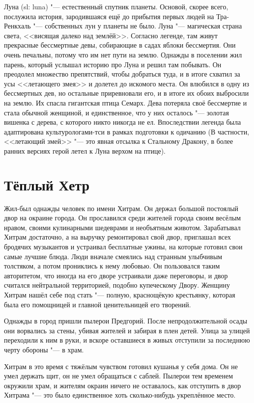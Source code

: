 \documentclass[a4paper,10pt,fleqn]{book}
\begin{document}
Луна (sl: luna) "--- естественный спутник планеты.
Основой, скорее всего, послужила история, зародившаяся ещё до прибытия первых людей на Тра-Ренкхаль "--- собственных лун у планеты не было.
Луна "--- магическая страна света, <<висящая далеко над землёй>>.
Согласно легенде, там живут прекрасные бессмертные девы, собирающие в садах яблоки бессмертия.
Они очень печальны, потому что им нет пути на землю.
Однажды в поселении жил парень, который услышал историю про Луна и решил там побывать.
Он преодолел множество препятствий, чтобы добраться туда, и в итоге схватил за усы <<летающего змея>> и долетел до искомого места.
Он влюбился в одну из бессмертных дев, но остальные приревновали его, и в итоге их обоих выбросили на землю.
Их спасла гигантская птица Семарх.
Дева потеряла своё бессмертие и стала обычной женщиной, и единственное, что у них осталось "--- золотая вишенка с дерева, с которого никто никогда не ел.
Впоследствии легенда была адаптирована культурологами-тси в рамках подготовки к одичанию (В частности, <<летающий змей>> "--- это явная отсылка к Стальному Дракону, в более ранних версиях герой летел к Луна верхом на птице).

\section{Тёплый Хетр}

Жил-был однажды человек по имени Хитрам.
Он держал большой постоялый двор на окраине города.
Он прославился среди жителей города своим весёлым нравом, своими кулинарными шедеврами и необъятным животом.
Зарабатывал Хитрам достаточно, а на выручку ремонтировал свой двор, приглашал всех бродячих музыкантов и устраивал бесплатные ужины, на которые готовил свои самые лучшие блюда.
Люди вначале смеялись над странным улыбчивым толстяком, а потом прониклись к нему любовью.
Он пользовался таким авторитетом, что иногда на его дворе устраивали даже переговоры, и двор считался нейтральной территорией, подобно купеческому Двору.
Женщину Хитрам нашёл себе под стать "--- полную, краснощёкую крестьянку, которая была его помощницей и главной ценительницей его творений.

Однажды в город пришли пылерои Предгорий.
После непродолжительной осады они ворвались за стены, убивая жителей и забирая в плен детей.
Улица за улицей переходили к ним в руки, и вскоре оставшиеся в живых отступили за последнюю черту обороны "--- в храм.

Хитрам в это время с тяжёлым чувством готовил кушанья у себя дома.
Он не умел держать щит, он не умел обращаться с саблей.
Пылерои тем временем окружили храм, и жителям окраин ничего не оставалось, как отступить в двор Хитрама "--- это было единственное хоть сколько-нибудь укреплённое место.
\end{document}
